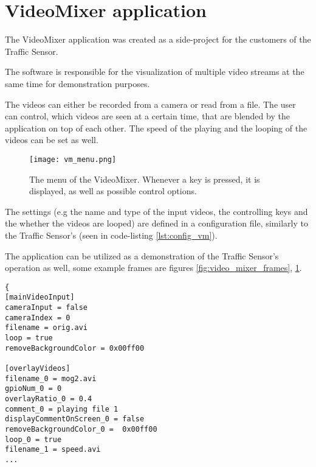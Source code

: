 \clearpage\section{VideoMixer application}
The VideoMixer application was created as a side-project for the customers of the Traffic Sensor.

The software is responsible for the visualization of multiple video streams at the same time for demonstration purposes.

The videos can either be recorded from a camera or read from a file.
The user can control, which videos are seen at a certain time, that are blended by the application on top of each other.
The speed of the playing and the looping of the videos can be set as well.

\begin{figure}[!h]
	\centering
	\texttt{[image: vm\_menu.png]}
	
	\caption[Menu of the VideoMixer]{The menu of the VideoMixer. Whenever a key is pressed, it is displayed, as well as possible control options. \label{fig:video_mixer_menu}}
\end{figure}

The settings (e.g the name and type of the input videos, the controlling keys and the whether the videos are looped) are defined in a configuration file, similarly to the Traffic Sensor's (seen in code-listing \ref{lst:config_vm}).

The application can be utilized as a demonstration of the Traffic Sensor's operation as well, some example frames are figures \ref{fig:video_mixer_frames}, \ref{fig:video_mixer_menu}.

\begin{lstlisting}[frame=single,float=!ht,caption={ Part of a configuration file for the VideoMixer application. The file sets parameters for the main input video {(section [mainVideoInput])}, and the overlay videos {(section [overlayVideos])}, that are blended on top. The file defines whether the video is read from a camera or a file, whether specific parts of the background are removed or not, and other adjustments, like the comment that is displayed on the screen, whenever a video starts playing.},label=lst:config_vm]
{
[mainVideoInput]
cameraInput = false
cameraIndex = 0
filename = orig.avi
loop = true
removeBackgroundColor = 0x00ff00

[overlayVideos]
filename_0 = mog2.avi
gpioNum_0 = 0
overlayRatio_0 = 0.4
comment_0 = playing file 1
displayCommentOnScreen_0 = false
removeBackgroundColor_0 =  0x00ff00
loop_0 = true
filename_1 = speed.avi
...
\end{lstlisting}

